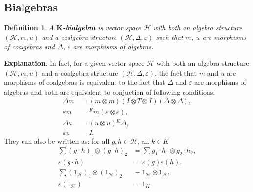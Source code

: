 \documentclass[a4paper, 12pt]{article}
\newtheorem{definition}{Definition}
\begin{document}
\subsection{Bialgebras}
\begin{definition}
A \textbf{$\textbf{K}$-bialgebra} is vector space $\mathcal{H}$ with both an algebra structure
$(\mathcal{H}, m, u)$ and a coalgebra structure $(\mathcal{H}, \Delta, \varepsilon)$ such that $m$, $u$
are morphisms of coalgebras and $\Delta$, $\varepsilon$ are morphisms of algebras.
\end{definition}
\textbf{Explanation. } In fact, for a given vector space $\mathcal{H}$ with both an algebra structure
$(\mathcal{H}, m, u)$ and a coalgebra structure $(\mathcal{H}, \Delta, \varepsilon)$, the fact that
$m$ and $u$ are morphisms of coalgebras is equivalent to the fact that $\Delta$ and $\varepsilon$ are
morphisms of
algebras and both are equivalent to conjuction of following conditions:
\begin{align*}
\Delta m &= (m\otimes m)(I \otimes T \otimes I)(\Delta \otimes \Delta), \\
\varepsilon m &= {^Km}(\varepsilon \otimes \varepsilon), \\
\Delta u &= (u \otimes u){^K\Delta}, \\
\varepsilon u &= I.
\end{align*}
They can also be written as: for all $g, h \in \mathcal{H}$, all $k \in K$
\begin{align*}
\sum (g \cdot h)_1 \otimes (g \cdot h)_2 &= \sum g_1 \cdot h_1 \otimes g_2 \cdot h_2, \\
\varepsilon(g \cdot h) &= \varepsilon(g)\varepsilon(h), \\
\sum (1_\mathcal{H})_1 \otimes (1_\mathcal{H})_2 &= 1_\mathcal{H} \otimes 1_\mathcal{H}, \\
\varepsilon (1_\mathcal{H}) &= 1_K.
\end{align*}
\end{document}
